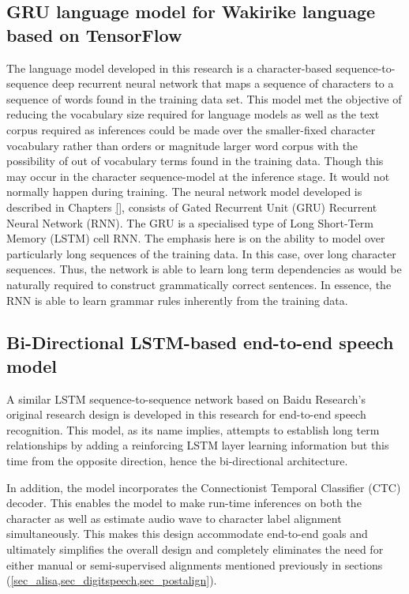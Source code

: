 \subsection{GRU language model for Wakirike language based on TensorFlow}\label{sec_grulm}
The language model developed in this research is a character-based sequence-to-sequence deep recurrent neural network that maps a sequence of characters to a sequence of words found in the training data set. This model met the objective of reducing the vocabulary size required for language models as well as the text corpus required as inferences could be made over the smaller-fixed character vocabulary rather than orders or magnitude larger word corpus with the possibility of out of vocabulary terms found in the training data.  Though this may occur in the character sequence-model at the inference stage.  It would not normally happen during training.  The neural network model developed is described in Chapters \ref{}, consists of Gated Recurrent Unit (GRU) Recurrent Neural Network (RNN). The GRU is a specialised type of Long Short-Term Memory (LSTM) cell RNN.  The emphasis here is on the ability to model over particularly long sequences of the training data.  In this case, over long character sequences.  Thus, the network is able to learn long term dependencies as would be naturally required to construct grammatically correct sentences.  In essence, the RNN is able to learn grammar rules inherently from the training data.

\subsection{Bi-Directional LSTM-based end-to-end speech model}\label{sec_be2e}
A similar LSTM sequence-to-sequence network based on Baidu Research’s original research design \citep{hannun2014deep} is developed in this research for end-to-end speech recognition.  This model, as its name implies, attempts to establish long term relationships by adding a reinforcing LSTM layer learning information but this time from the opposite direction, hence the bi-directional architecture.  

In addition, the model incorporates the Connectionist Temporal Classifier (CTC) decoder. This enables the model to make run-time inferences on both the character as well as estimate audio wave to character label alignment simultaneously.  This makes this design accommodate end-to-end goals and ultimately simplifies the overall design and completely eliminates the need for either manual or semi-supervised alignments mentioned previously in sections (\ref{sec_alisa,sec_digitspeech,sec_postalign}).

